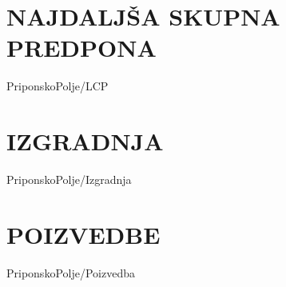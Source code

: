 


\section{NAJDALJŠA SKUPNA PREDPONA}\label{sec:LCP}
{PriponskoPolje/LCP}

\newpage

\section{IZGRADNJA}\label{sec:SAIzgradnja}
{PriponskoPolje/Izgradnja}



\section{POIZVEDBE}\label{sec:SAPoizvedbe}
{PriponskoPolje/Poizvedba}